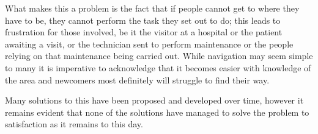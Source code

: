 What makes this a problem is the fact that if people cannot get to where they have to be, they cannot perform the task they set out to do; this leads to frustration for those involved, be it the visitor at a hospital or the patient awaiting a visit, or the technician sent to perform maintenance or the people relying on that maintenance being carried out. While navigation may seem simple to many it is imperative to acknowledge that it becomes easier with knowledge of the area and newcomers most definitely will struggle to find their way.

Many solutions to this have been proposed and developed over time, however it remains evident that none of the solutions have managed to solve the problem to satisfaction as it remains to this day.

